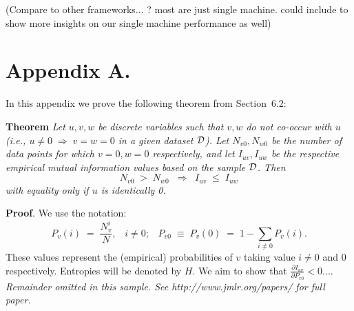 \documentclass[twoside,11pt]{article}
\newcommand{\dataset}{{\cal D}}
\newcommand{\fracpartial}[2]{\frac{\partial #1}{\partial  #2}}
\newcommand{\0}{\mathbf{0}} %
\begin{document}
(Compare to other frameworks... ? most are just single machine. could include to show more insights on our single machine performance as well)






\newpage

\appendix
\section*{Appendix A.}
\label{app:theorem}



In this appendix we prove the following theorem from
Section~6.2:

\noindent
{\bf Theorem} {\it Let $u,v,w$ be discrete variables such that $v, w$ do
not co-occur with $u$ (i.e., $u\neq0\;\Rightarrow \;v=w=0$ in a given
dataset $\dataset$). Let $N_{v0},N_{w0}$ be the number of data points for
which $v=0, w=0$ respectively, and let $I_{uv},I_{uw}$ be the
respective empirical mutual information values based on the sample
$\dataset$. Then
\[
	N_{v0} \;>\; N_{w0}\;\;\Rightarrow\;\;I_{uv} \;\leq\;I_{uw}
\]
with equality only if $u$ is identically 0.} \hfill\BlackBox

\noindent
{\bf Proof}. We use the notation:
\[
P_v(i) \;=\;\frac{N_v^i}{N},\;\;\;i \neq 0;\;\;\;
P_{v0}\;\equiv\;P_v(0)\; = \;1 - \sum_{i\neq 0}P_v(i).
\]
These values represent the (empirical) probabilities of $v$
taking value $i\neq 0$ and 0 respectively.  Entropies will be denoted
by $H$. We aim to show that $\fracpartial{I_{uv}}{P_{v0}} < 0$....\\

{\noindent \em Remainder omitted in this sample. See http://www.jmlr.org/papers/ for full paper.}


\vskip 0.2in

\end{document}
